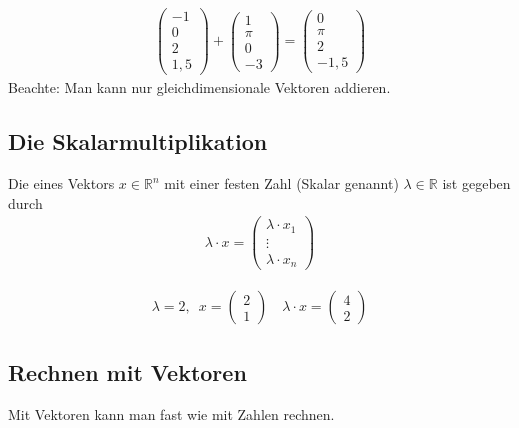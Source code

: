 \begin{align*}
	\begin{pmatrix} -1 \\ 0 \\ 2 \\ 1,5 \end{pmatrix} + \begin{pmatrix} 1 \\ \pi \\ 0 \\ -3 \end{pmatrix} = \begin{pmatrix} 0 \\ \pi \\ 2 \\ -1,5 \end{pmatrix}
\end{align*}
Beachte: Man kann nur gleichdimensionale Vektoren addieren.

\subsection{Die Skalarmultiplikation}
Die  eines Vektors $x \in \mathbb{R}^n$ mit einer festen Zahl (Skalar genannt) $\lambda \in \mathbb{R}$ ist gegeben durch
\begin{align*}
	\lambda \cdot x = \begin{pmatrix} \lambda \cdot x_1 \\ \vdots \\ \lambda \cdot x_n \end{pmatrix}
\end{align*}

\begin{align*}
	\lambda = 2, \enspace x = \begin{pmatrix}2 \\ 1\end{pmatrix} \quad \lambda \cdot x = \begin{pmatrix}4 \\ 2\end{pmatrix}
\end{align*}

\subsection{Rechnen mit Vektoren}
Mit Vektoren kann man fast wie mit Zahlen rechnen.

